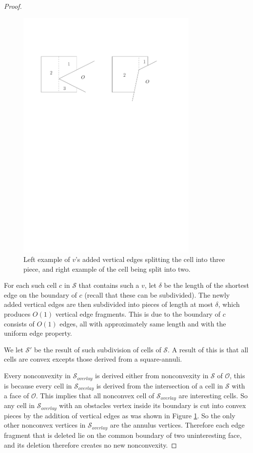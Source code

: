 \begin{proof}
\begin{figure}
	\centering
	\includegraphics[width=0.8\textwidth]{figures/nonconvextoconvex.pdf}
	\caption{Left example of $v$'s added vertical edges splitting the cell into three 
    		 piece, and right example of the cell being split into two\cite{HershbergerS99}.}
	\label{fig:vinteriorinobstacle}
\end{figure}

For each such cell $c$ in $\mathcal{S}$ that contains such a $v$, let $\delta$ be the 
length of the shortest edge on the boundary of $c$ (recall that these can be subdivided). 
The newly added vertical edges are then subdivided into pieces of length at most $\delta$, 
which produces $O(1)$ vertical edge fragments. This is due to the boundary of $c$ consists 
of $O(1)$ edges, all with approximately same length and with the uniform edge property. 

We let $\mathcal{S}'$ be the result of such subdivision of cells of $\mathcal{S}$. A 
result of this is that all cells are convex excepts those derived from a square-annuli. 

Every nonconvexity in $\mathcal{S}_{overlay}$ is derived either from nonconvexity in 
$\mathcal{S}$ of $\mathcal{O}$, this is because every cell in $\mathcal{S}_{overlay}$ is 
derived from the intersection of a cell in $\mathcal{S}$ with a face of $\mathcal{O}$. 
This implies that all nonconvex cell of $\mathcal{S}_{overlay}$ are interesting cells. So 
any cell in $\mathcal{S}_{overlay}$ with an obstacles vertex inside its boundary is cut 
into convex pieces by the addition of vertical edges as was shown in Figure 
\ref{fig:vinteriorinobstacle}. So the only other nonconvex vertices in 
$\mathcal{S}_{overlay}$ are the annulus vertices. Therefore each edge fragment that is 
deleted lie on the common boundary of two uninteresting face, and its deletion therefore 
creates no new nonconvexity. 


\end{proof}
